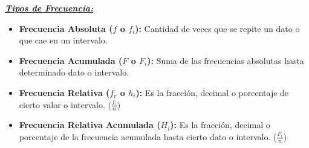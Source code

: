 \documentclass[12pt, letterpaper]{article}
\begin{document}
\textbf{\textit{\underline{Tipos de Frecuencia:}}}
\begin{itemize}
    \item \textbf{Frecuencia Absoluta ($f$ o $f_i$):} Cantidad de veces que se repite un dato o que cae en un intervalo. %
    \item \textbf{Frecuencia Acumulada ($F$ o $F_i$):} Suma de las frecuencias absolutas hasta determinado dato o intervalo. %
    \item \textbf{Frecuencia Relativa ($f_r$ o $h_i$):} Es la fracción, decimal o porcentaje de cierto valor o intervalo. ($\frac{f_i}{n}$) %
    \item \textbf{Frecuencia Relativa Acumulada ($H_i$):} Es la fracción, decimal o porcentaje de la frecuencia acumulada hasta cierto dato o intervalo. ($\frac{F_i}{n}$) %
\end{itemize}
\end{document}
